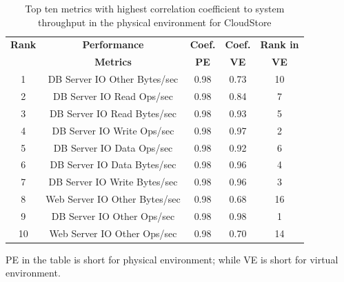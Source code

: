 \begin{table}[tbh]
	\centering
	\caption{Top ten metrics with highest correlation coefficient to system throughput in the physical environment for CloudStore}
	\label{tab:top10csp}
	\begin{threeparttable}
	
		\begin{tabular}{|c||c|c|c|c|}
			\hline
			\textbf{Rank} & \textbf{Performance } & \textbf{Coef. } & \textbf{Coef. } & \textbf{Rank in} \\ %
			& \textbf{ Metrics} & \textbf{PE} & \textbf{VE} & \textbf{VE} \\ %
			\midrule
			1 & DB Server IO Other Bytes/sec & 0.98 & 0.73 & 10 \\ \hline
			2 & DB Server IO Read Ops/sec & 0.98 & 0.84 & 7 \\ \hline
			3 & DB Server IO Read Bytes/sec & 0.98 & 0.93 & 5 \\ \hline
			4 & DB Server IO Write Ops/sec & 0.98 & 0.97 & 2 \\ \hline
			5 & DB Server IO Data Ops/sec & 0.98 & 0.92 & 6 \\ \hline
			6 & DB Server IO Data Bytes/sec & 0.98 & 0.96 & 4 \\ \hline
			7 & DB Server IO Write Bytes/sec & 0.98 & 0.96 & 3 \\ \hline
			8 & Web Server IO Other Bytes/sec & 0.98 & 0.68 & 16 \\ \hline
			9 & DB Server IO Other Ops/sec & 0.98 & 0.98 & 1 \\ \hline
			10 & Web Server IO Other Ops/sec & 0.98 & 0.70 & 14 \\ \hline
		\end{tabular}%
		\begin{tablenotes}
			\item PE in the table is short for physical environment; while VE is short for virtual environment.
		\end{tablenotes}
	\end{threeparttable}
	
	
\end{table}


